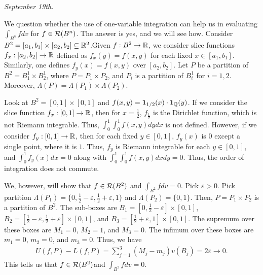 \noindent\textit{September 19th.}

We question whether the use of one-variable integration can help us in evaluating $\int_{B^{n}} f dv$ for $f \in \mathcal{R}(B^{n})$. The answer is yes, and we will see how. Consider $B^{2} = [a_{1},b_{1}] \times [a_{2},b_{2}] \subseteq \mathbb{R}^{2}$.Given $f:B^{2} \to \mathbb{R}$, we consider slice functions $f_{x}:[a_{2},b_{2}] \to \mathbb{R}$ defined as $f_{x}(y) = f(x,y)$ for each fixed $x \in [a_{1},b_{1}]$. Similarly, one defines $f_{y}(x) = f(x,y)$ over $[a_{2},b_{2}]$. Let $P$ be a partition of $B^{2} = B_{1}^{1} \times B_{2}^{1}$, where $P = P_{1} \times P_{2}$, and $P_{i}$ is a partition of $B_{i}^{1}$ for $i=1,2$. Moreover, $\Lambda(P) = \Lambda(P_{1}) \times \Lambda(P_{2})$.

\begin{example}
    Look at $B^{2} = [0,1] \times [0,1]$ and $f(x,y) = \textbf{1}_{1/2}(x) \cdot \textbf{1}_{\mathbb{Q}}(y)$. If we consider the slice function $f_{x}:[0,1] \to \mathbb{R}$, then for $x = \frac{1}{2}$, $f_{\frac{1}{2}}$ is the Dirichlet function, which is not Riemann integrable. Thus, $\int_{0}^{1} \int_{0}^{1} f(x,y) dy dx$ is not defined. However, if we consider $f_{y}:[0,1] \to \mathbb{R}$, then for each fixed $y \in [0,1]$, $f_{y}(x)$ is $0$ except a single point, where it is $1$. Thus, $f_{y}$ is Riemann integrable for each $y \in [0,1]$, and $\int_{0}^{1} f_{y}(x) dx = 0$ along with $\int_{0}^{1} \int_{0}^{1} f(x,y) dx dy = 0$. Thus, the order of integration does not commute.

    We, however, will show that $f \in \mathcal{R}(B^{2})$ and $\int_{B^{2}} f dv = 0$. Pick $\varepsilon > 0$. Pick partition $\Lambda(P_{1}) = \{0,\frac{1}{2}-\varepsilon,\frac{1}{2}+\varepsilon,1\}$ and $\Lambda(P_{2}) = \{0,1\}$. Then, $P = P_{1} \times P_{2}$ is a partition of $B^{2}$. The sub-boxes are $B_{1} = [0,\frac{1}{2}-\varepsilon] \times [0,1]$, $B_{2} = [\frac{1}{2}-\varepsilon,\frac{1}{2}+\varepsilon] \times [0,1]$, and $B_{3} = [\frac{1}{2}+\varepsilon,1] \times [0,1]$. The supremum over these boxes are $M_{1} = 0$, $M_{2} = 1$, and $M_{3} = 0$. The infimum over these boxes are $m_{1} = 0$, $m_{2} = 0$, and $m_{3} = 0$. Thus, we have
    \begin{align}
        U(f,P) - L(f,P) = \sum_{j=1}^{3} (M_{j} - m_{j}) v(B_{j}) = 2\varepsilon \to 0.
    \end{align}
    This tells us that $f \in \mathcal{R}(B^{2})$and $\int_{B^{2}} f dv = 0$.
\end{example}

